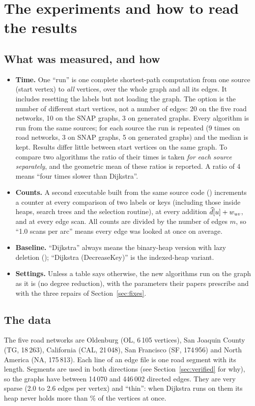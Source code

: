 \section{The experiments and how to read the results}
\subsection{What was measured, and how}
\begin{itemize}
\item \textbf{Time.} One ``run'' is one complete shortest-path computation from one source (start vertex) to \emph{all} vertices, over the whole graph and all its edges. It includes resetting the labels but not loading the graph. The option  is the number of different start vertices, not a number of edges: 20 on the five road networks, 10 on the SNAP graphs, 3 on generated graphs. Every algorithm is run from the same sources; for each source the run is repeated (9 times on road networks, 3 on SNAP graphs, 5 on generated graphs) and the median is kept. Results differ little between start vertices on the same graph. To compare two algorithms the ratio of their times is taken \emph{for each source separately}, and the geometric mean of these ratios is reported. A ratio of 4 means ``four times slower than Dijkstra''.
\item \textbf{Counts.} A second executable built from the same source code () increments a counter at every comparison of two labels or keys (including those inside heaps, search trees and the selection routine), at every addition $\widehat{d}[u]+w_{uv}$, and at every edge scan. All counts are divided by the number of edges $m$, so ``1.0 scans per arc'' means every edge was looked at once on average.
\item \textbf{Baseline.} ``Dijkstra'' always means the binary-heap version with lazy deletion (); ``Dijkstra (DecreaseKey)'' is the indexed-heap variant.
\item \textbf{Settings.} Unless a table says otherwise, the new algorithms run on the graph as it is (no degree reduction), with the parameters their papers prescribe and with the three repairs of Section~\ref{sec:fixes}.
\end{itemize}

\subsection{The data}
The five road networks are Oldenburg (OL, 6\,105 vertices), San Joaquin County (TG, 18\,263), California (CAL, 21\,048), San Francisco (SF, 174\,956) and North America (NA, 175\,813). Each line of an edge file is one road segment with its length. Segments are used in both directions (see Section~\ref{sec:verified} for why), so the graphs have between 14\,070 and 446\,002 directed edges. They are very sparse (2.0 to 2.6 edges per vertex) and ``thin'': when Dijkstra runs on them its heap never holds more than \RoadPeakMax\% of the vertices at once.

